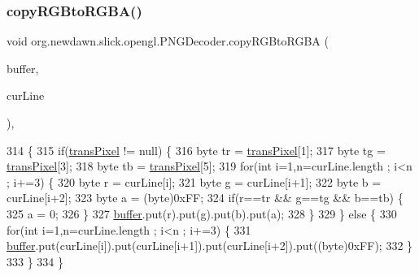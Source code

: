 \subsubsection{\texorpdfstring{copy\+R\+G\+Bto\+R\+G\+B\+A()}{copyRGBtoRGBA()}}
{\footnotesize\ttfamily void org.\+newdawn.\+slick.\+opengl.\+P\+N\+G\+Decoder.\+copy\+R\+G\+Bto\+R\+G\+BA (\begin{DoxyParamCaption}\item[{Byte\+Buffer}]{buffer,  }\item[{byte \mbox{[}$\,$\mbox{]}}]{cur\+Line }\end{DoxyParamCaption})\hspace{0.3cm}{\ttfamily [inline]}, {\ttfamily [private]}}


\begin{DoxyCode}
314                                                                   \{
315         \textcolor{keywordflow}{if}(\mbox{\hyperlink{classorg_1_1newdawn_1_1slick_1_1opengl_1_1_p_n_g_decoder_ad3c546cf013c0c8bdee84a07fdc08389}{transPixel}} != null) \{
316             byte tr = \mbox{\hyperlink{classorg_1_1newdawn_1_1slick_1_1opengl_1_1_p_n_g_decoder_ad3c546cf013c0c8bdee84a07fdc08389}{transPixel}}[1];
317             byte tg = \mbox{\hyperlink{classorg_1_1newdawn_1_1slick_1_1opengl_1_1_p_n_g_decoder_ad3c546cf013c0c8bdee84a07fdc08389}{transPixel}}[3];
318             byte tb = \mbox{\hyperlink{classorg_1_1newdawn_1_1slick_1_1opengl_1_1_p_n_g_decoder_ad3c546cf013c0c8bdee84a07fdc08389}{transPixel}}[5];
319             \textcolor{keywordflow}{for}(\textcolor{keywordtype}{int} i=1,n=curLine.length ; i<n ; i+=3) \{
320                 byte r = curLine[i];
321                 byte g = curLine[i+1];
322                 byte b = curLine[i+2];
323                 byte a = (byte)0xFF;
324                 \textcolor{keywordflow}{if}(r==tr && g==tg && b==tb) \{
325                     a = 0;
326                 \}
327                 \mbox{\hyperlink{classorg_1_1newdawn_1_1slick_1_1opengl_1_1_p_n_g_decoder_ae205f9222586a2bc01a8a240c5c210ad}{buffer}}.put(r).put(g).put(b).put(a);
328             \}
329         \} \textcolor{keywordflow}{else} \{
330             \textcolor{keywordflow}{for}(\textcolor{keywordtype}{int} i=1,n=curLine.length ; i<n ; i+=3) \{
331                 \mbox{\hyperlink{classorg_1_1newdawn_1_1slick_1_1opengl_1_1_p_n_g_decoder_ae205f9222586a2bc01a8a240c5c210ad}{buffer}}.put(curLine[i]).put(curLine[i+1]).put(curLine[i+2]).put((byte)0xFF);
332             \}
333         \}
334     \}
\end{DoxyCode}
\mbox{\label{classorg_1_1newdawn_1_1slick_1_1opengl_1_1_p_n_g_decoder_aba256a6afc6ba9bd28f8244d7a79d09d}} 
